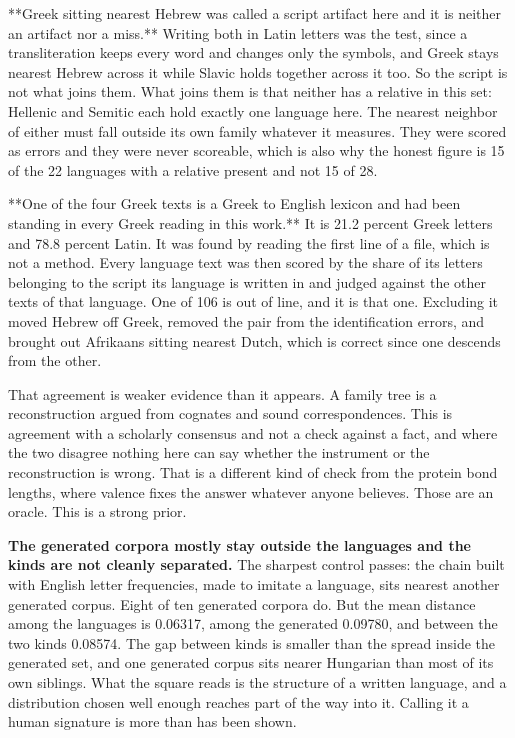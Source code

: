 **Greek sitting nearest Hebrew was called a script artifact here and it is neither an artifact nor a miss.** Writing both in Latin letters was the test, since a transliteration keeps every word and changes only the symbols, and Greek stays nearest Hebrew across it while Slavic holds together across it too. So the script is not what joins them. What joins them is that neither has a relative in this set: Hellenic and Semitic each hold exactly one language here. The nearest neighbor of either must fall outside its own family whatever it measures. They were scored as errors and they were never scoreable, which is also why the honest figure is 15 of the 22 languages with a relative present and not 15 of 28.

**One of the four Greek texts is a Greek to English lexicon and had been standing in every Greek reading in this work.** It is 21.2 percent Greek letters and 78.8 percent Latin. It was found by reading the first line of a file, which is not a method. Every language text was then scored by the share of its letters belonging to the script its language is written in and judged against the other texts of that language. One of 106 is out of line, and it is that one. Excluding it moved Hebrew off Greek, removed the pair from the identification errors, and brought out Afrikaans sitting nearest Dutch, which is correct since one descends from the other.

That agreement is weaker evidence than it appears. A family tree is a reconstruction argued from cognates and sound correspondences. This is agreement with a scholarly consensus and not a check against a fact, and where the two disagree nothing here can say whether the instrument or the reconstruction is wrong. That is a different kind of check from the protein bond lengths, where valence fixes the answer whatever anyone believes. Those are an oracle. This is a strong prior.

\textbf{The generated corpora mostly stay outside the languages and the kinds are not cleanly separated.} The sharpest control passes: the chain built with English letter frequencies, made to imitate a language, sits nearest another generated corpus. Eight of ten generated corpora do. But the mean distance among the languages is 0.06317, among the generated 0.09780, and between the two kinds 0.08574. The gap between kinds is smaller than the spread inside the generated set, and one generated corpus sits nearer Hungarian than most of its own siblings. What the square reads is the structure of a written language, and a distribution chosen well enough reaches part of the way into it. Calling it a human signature is more than has been shown.

